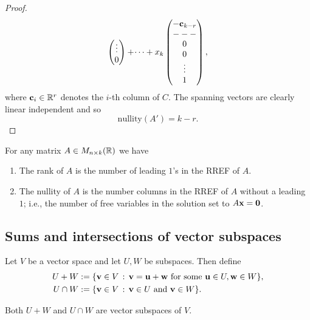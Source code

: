 \documentclass[10pt, a4paper]{article}
\begin{document}
\begin{theorem}
\begin{proof}
\[\begin{pmatrix}
            \vdots \\
            0
        \end{pmatrix}
        +
        \dotsi
        +
        x_k\begin{pmatrix}
            -\mathbf{c}_{k - r} \\
            - - - \\
            0 \\
            0 \\
            \vdots \\
            1
        \end{pmatrix},
        \]
        where $\mathbf{c}_i \in \mathbb{R} ^ r$ denotes the $i$-th column of $C$.
        The spanning vectors are clearly linear independent and so
        \[
        \mathrm{nullity}(A') = k - r.
        \]
    \end{proof}
\end{theorem}

\begin{corollary}
    For any matrix $A \in M_{n \times k}(\mathbb{R})$ we have
    \begin{enumerate}[label = (\roman*)]
        \item The rank of $A$ is the number of leading $1$'s in the RREF of $A$.
        \item The nullity of $A$ is the number columns in the RREF of $A$ without a leading $1$;
        i.e.,
        the number of free variables in the solution set to $A\mathbf{x} = \mathbf{0}$.
    \end{enumerate}
\end{corollary}

\subsection{Sums and intersections of vector subspaces}
Let $V$ be a vector space and let $U, W$ be subspaces.
Then define
\begin{align*}
    U + W &:= \{\mathbf{v} \in V\,:\, \mathbf{v} = \mathbf{u + w}\text{ for some }\mathbf{u} \in U, \mathbf{w} \in W\}, \\
    U \cap W &:= \{\mathbf{v} \in V\,:\, \mathbf{v} \in U\text{ and } \mathbf{v} \in W\}.
\end{align*}

Both $U + W$ and $U \cap W$ are vector subspaces of $V$.
\end{document}
